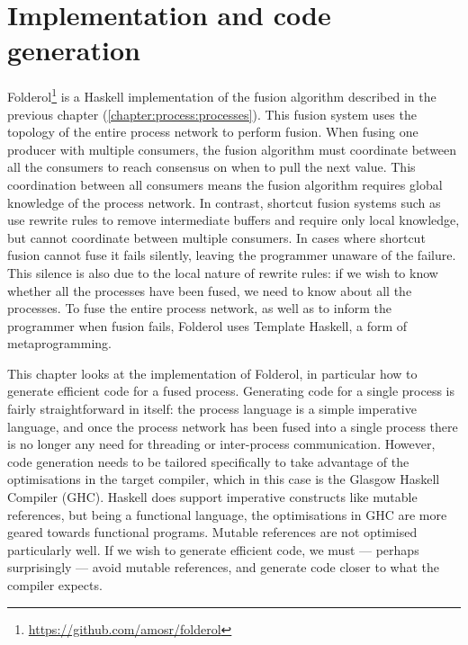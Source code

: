 \chapter{Implementation and code generation}
\label{chapter:process:implementation}

Folderol\footnote{\url{https://github.com/amosr/folderol}} is a Haskell implementation of the fusion algorithm described in the previous chapter (\autoref{chapter:process:processes}).
This fusion system uses the topology of the entire process network to perform fusion.
When fusing one producer with multiple consumers, the fusion algorithm must coordinate between all the consumers to reach consensus on when to pull the next value.
This coordination between all consumers means the fusion algorithm requires global knowledge of the process network.
In contrast, shortcut fusion systems such as \cite{gill1993short} use rewrite rules to remove intermediate buffers and require only local knowledge, but cannot coordinate between multiple consumers.
In cases where shortcut fusion cannot fuse it fails silently, leaving the programmer unaware of the failure.
This silence is also due to the local nature of rewrite rules: if we wish to know whether all the processes have been fused, we need to know about all the processes.
To fuse the entire process network, as well as to inform the programmer when fusion fails, Folderol uses Template Haskell, a form of metaprogramming.

This chapter looks at the implementation of Folderol, in particular how to generate efficient code for a fused process.
Generating code for a single process is fairly straightforward in itself: the process language is a simple imperative language, and once the process network has been fused into a single process there is no longer any need for threading or inter-process communication.
However, code generation needs to be tailored specifically to take advantage of the optimisations in the target compiler, which in this case is the Glasgow Haskell Compiler (GHC).
Haskell does support imperative constructs like mutable references, but being a functional language, the optimisations in GHC are more geared towards functional programs.
Mutable references are not optimised particularly well.
If we wish to generate efficient code, we must --- perhaps surprisingly --- avoid mutable references, and generate code closer to what the compiler expects.









